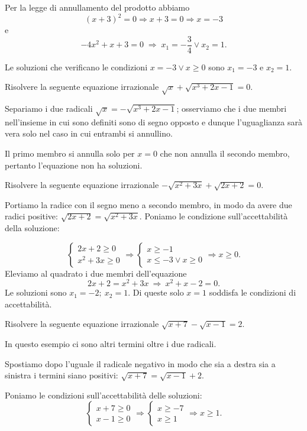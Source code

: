 \begin{exrig}
\begin{esempio}
Per la legge di annullamento del prodotto abbiamo 
\[(x+3)^2=0\Rightarrow x+3=0\Rightarrow x=-3\] e 
\[-4x^2+x+3=0\;\Rightarrow \;x_1=-\frac 3 4\vee x_2=1.\]

Le soluzioni che verificano le condizioni $x=-3\vee x\ge 0$ sono $ x_1=-3 $ e $ x_2=1 $.
\end{esempio}
\begin{esempio}
Risolvere la seguente equazione irrazionale $\sqrt x+\sqrt{x^3+2x-1}=0$.

Separiamo i due radicali $\sqrt x=-\sqrt{x^3+2x-1}$; osserviamo che i due membri nell’insieme in cui sono definiti sono di segno opposto e dunque l’uguaglianza sarà vera solo nel caso in cui entrambi si annullino.

Il primo membro si annulla solo per $x=0$ che non annulla il secondo membro, pertanto l’equazione non ha soluzioni.
\end{esempio}
\begin{esempio}
Risolvere la seguente equazione irrazionale $-\sqrt{x^2+3x}+\sqrt{2x+2}=0$.

Portiamo la radice con il segno meno a secondo membro, in modo da avere due radici positive:
$\sqrt{2x+2}=\sqrt{x^2+3x}$. Poniamo le condizione sull'accettabilità della soluzione:

\begin{equation*}
\left\{\begin{array}{l}{2x+2\ge 0}\\{x^2+3x\ge 0}\end{array}\right. \Rightarrow \left\{\begin{array}{l}{x\ge -1}\\{x\le -3\vee x\ge 0}\end{array}\right.\Rightarrow x\ge 0.
\end{equation*}
Eleviamo al quadrato i due membri dell'equazione 
\[2x+2=x^2+3x\ \Rightarrow \ x^2+x-2=0.\]
Le soluzioni sono $x_1=-2;\ x_2=1$. Di queste solo $x=1$ soddisfa le condizioni di accettabilità.
\end{esempio}

\begin{esempio}
Risolvere la seguente equazione irrazionale $\sqrt{x+7}-\sqrt{x-1}=2$.

In questo esempio ci sono altri termini oltre i due radicali.

Spostiamo dopo l'uguale il radicale negativo in modo che sia a destra sia a sinistra i termini siano positivi: $\sqrt{x+7}=\sqrt{x-1}+2$.

Poniamo le condizioni sull'accettabilità delle soluzioni: \[ \left\{\begin{array}{l}{x+7\ge 0}\\{x-1\ge 0}\end{array}\right.\Rightarrow \left\{\begin{array}{l}{x\ge -7}\\{x\ge 1}\end{array}\right.\Rightarrow x\ge 1. \]


\end{esempio}
\end{exrig}
